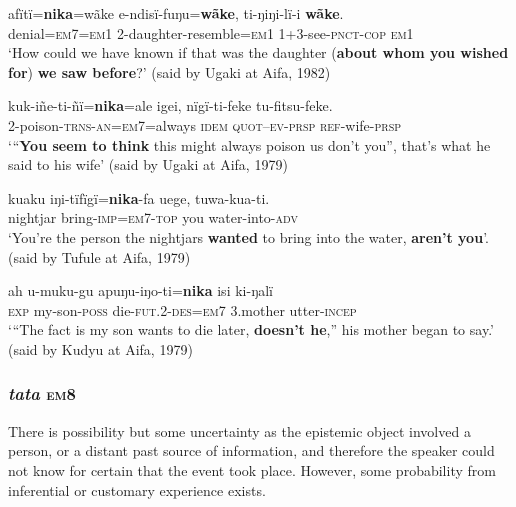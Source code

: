 \documentclass[output=paper]{langsci/langscibook}
\begin{document}
\begin{exe}
	\ex \label{ex:eb14}
	\gll afïtï=\textbf{nika}=wãke e-ndisï-fuŋu=\textbf{wãke}, ti-ŋiŋi-lï-i \textbf{wãke}.\\
	denial=\textsc{em7=em1} 2-daughter-resemble=\textsc{em1} 1+3-see-\textsc{pnct-cop} \textsc{em1}\\
	\trans ‘How could we have known if that was the daughter (\textbf{about whom you wished for}) \textbf{we saw before}?' (said by Ugaki at Aifa, 1982)
\end{exe}

\begin{exe}
	\ex \label{ex:eb15}
	\gll kuk-iñe-ti-ñï=\textbf{nika}=ale igei, nïgï-ti-feke tu-fitsu-feke.\\
	2-poison-\textsc{trns-an=em7}=always \textsc{idem} \textsc{quot–ev-prsp} \textsc{ref}-wife-\textsc{prsp}\\
	\trans `“\textbf{You seem to think} this might always poison us don’t you”, that’s what he said to his wife' (said by Ugaki at Aifa, 1979)
\end{exe}

\begin{exe}
	\ex \label{ex:eb16}
	\gll kuaku iŋi-tïfïgï=\textbf{nika}-fa uege, tuwa-kua-ti.\\
	nightjar bring-\textsc{imp=em7-top} you water-into-\textsc{adv}\\
	\trans ‘You’re the person the nightjars \textbf{wanted} to bring into the water, \textbf{aren’t you}’. (said by Tufule at Aifa, 1979)
\end{exe}

\begin{exe}
	\ex \label{ex:eb17}
	\gll ah u-muku-gu apuŋu-iŋo-ti=\textbf{nika} isi ki-ŋalï\\
	\textsc{exp} my-son-\textsc{poss} die-\textsc{fut}.2-\textsc{des=em7} 3.mother utter-\textsc{incep}\\
	\trans `“The fact is my son wants to die later, \textbf{doesn’t he},”  his mother began to say.' (said by Kudyu at Aifa, 1979)
\end{exe}

\subsubsection{\textit{tata} \textsc{em}8}
There is possibility but some uncertainty as the epistemic object involved a  person, or a distant past source of information, and therefore the speaker could not know for certain that the event took place. However,  some probability from inferential or customary experience exists.  
\end{document}
